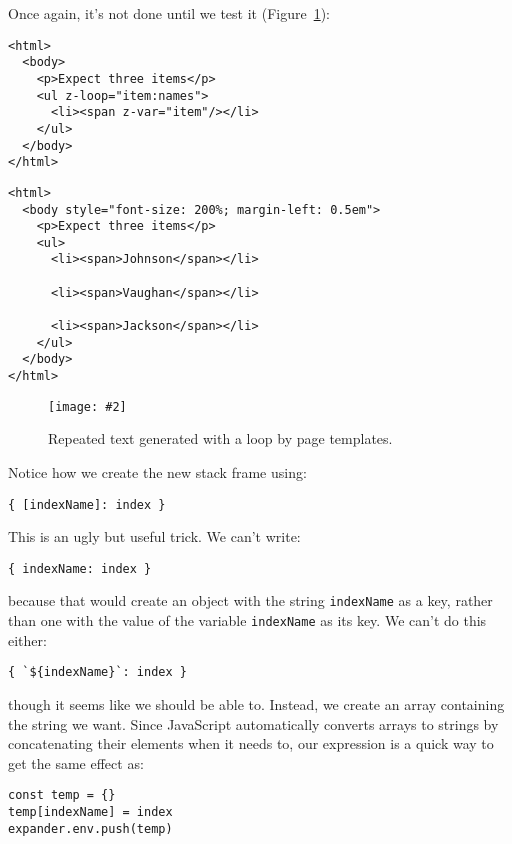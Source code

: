 \documentclass[krantzl]{krantz}
\newcommand{\figpdf}[4]{\begin{figure}%
\centering%
\texttt{[image: \#2]}%
\caption{#3}%
\label{#1}%
\end{figure}}
\newcommand{\figref}[1]{Figure~\ref{#1}}
\begin{document}
Once again,
it's not done until we test it (\figref{page-templates-output-loop}):


\begin{lstlisting}[frame=single,frameround=tttt]
<html>
  <body>
    <p>Expect three items</p>
    <ul z-loop="item:names">
      <li><span z-var="item"/></li>
    </ul>
  </body>
</html>
\end{lstlisting}



\begin{lstlisting}[frame=single,frameround=tttt]
<html>
  <body style="font-size: 200%; margin-left: 0.5em">
    <p>Expect three items</p>
    <ul>
      <li><span>Johnson</span></li>

      <li><span>Vaughan</span></li>

      <li><span>Jackson</span></li>
    </ul>
  </body>
</html>
\end{lstlisting}


\figpdf{page-templates-output-loop}{./page-templates/output-loop.pdf}{Repeated text generated with a loop by page templates.}{0.6}


Notice how we create the new stack frame using:

\begin{lstlisting}[frame=single,frameround=tttt]
{ [indexName]: index }
\end{lstlisting}


\noindent This is an ugly but useful trick.
We can't write:

\begin{lstlisting}[frame=single,frameround=tttt]
{ indexName: index }
\end{lstlisting}


\noindent because that would create an object with the string \texttt{indexName} as a key,
rather than one with the value of the variable \texttt{indexName} as its key.
We can't do this either:

\begin{lstlisting}[frame=single,frameround=tttt]
{ `${indexName}`: index }
\end{lstlisting}


\noindent though it seems like we should be able to.
Instead,
we create an array containing the string we want.
Since JavaScript automatically converts arrays to strings
by concatenating their elements when it needs to,
our expression is a quick way to get the same effect as:

\begin{lstlisting}[frame=single,frameround=tttt]
const temp = {}
temp[indexName] = index
expander.env.push(temp)
\end{lstlisting}
\end{document}
